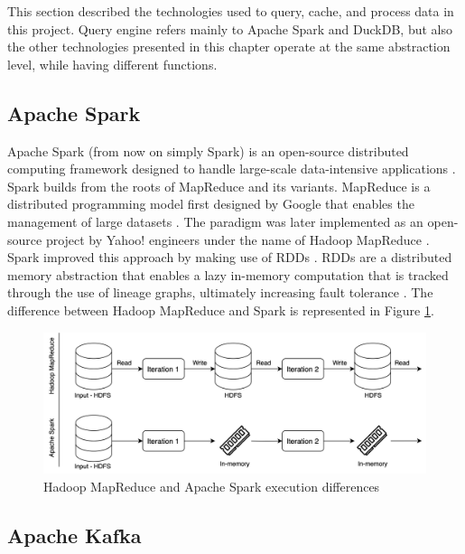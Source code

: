 This section described the technologies used to query, cache, and process data in this project. Query engine refers mainly to Apache Spark and DuckDB, but also the other technologies presented in this chapter operate at the same abstraction level, while having different functions.

\subsection{Apache Spark}

Apache Spark (from now on simply Spark) is an open-source distributed computing framework designed to handle large-scale data-intensive applications \cite{zahariaApacheSparkUnified2016}. Spark builds from the roots of MapReduce and its variants. MapReduce is a distributed programming model first designed by Google that enables the management of large datasets \cite{dean2004mapreduce}. The paradigm was later implemented as an open-source project by Yahoo! engineers under the name of Hadoop MapReduce \cite{borthakurHadoopDistributedFile2005}. Spark improved this approach by making use of \glspl{RDD} \cite{Zaharia:EECS-2011-82}. \glspl{RDD} are a distributed memory abstraction that enables a lazy in-memory computation that is tracked through the use of lineage graphs, ultimately increasing fault tolerance \cite{Zaharia:EECS-2011-82}. The difference between Hadoop MapReduce and Spark is represented in Figure \ref{fig:MapReducevsSpark}.

\begin{figure}[!ht]
  \begin{center}
    \includegraphics[width=\textwidth]{figures/2-background/Spark_MapReduce.png}
  \end{center}
  \caption{Hadoop MapReduce and Apache Spark execution differences}
  \label{fig:MapReducevsSpark}
\end{figure}

\subsection{Apache Kafka}

